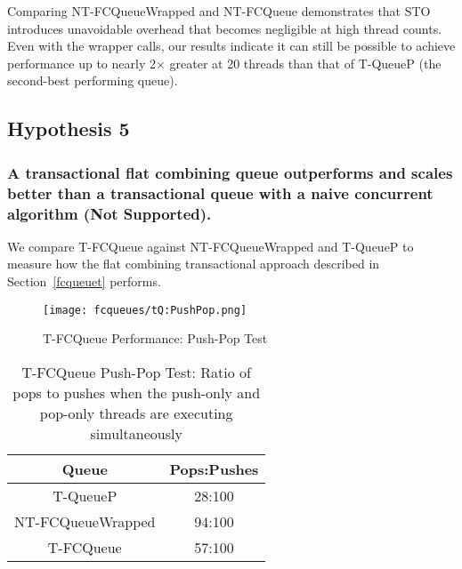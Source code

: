 Comparing NT-FCQueueWrapped and NT-FCQueue demonstrates that STO introduces unavoidable overhead that becomes negligible at high thread counts. Even with the wrapper calls, our results indicate it can still be possible to achieve performance up to nearly 2$\times$ greater at 20 threads than that of T-QueueP (the second-best performing queue).

\vspace{12pt}
\noindent{}

\subsection{Hypothesis 5}
\subsubsection{A transactional flat combining queue outperforms and scales better than a transactional queue with a naive concurrent algorithm (Not Supported).}
\label{eval:hypo5}

We compare T-FCQueue against NT-FCQueueWrapped and T-QueueP to measure how the flat combining transactional approach described in Section~\ref{fcqueuet} performs.

\begin{figure}[t!]
    \centering
	\begin{minipage}{0.9\textwidth}
        {\texttt{[image: fcqueues/tQ:PushPop.png]}}
	\end{minipage}
        \caption{T-FCQueue Performance: Push-Pop Test}
        \label{fig:tqs_pp}
\end{figure}

\begin{table}[t!]
        \centering
    \begin{tabular}{|cc|}
        \hline
        Queue & Pops:Pushes\\
        \hline
            T-QueueP & 28:100\\
            NT-FCQueueWrapped & 94:100\\
            T-FCQueue & 57:100\\
        \hline
    \end{tabular}
    \caption{T-FCQueue Push-Pop Test: Ratio of pops to pushes when the push-only and pop-only threads are executing simultaneously}
    \label{tab:tfc_pop_push_ratio}
\end{table}

